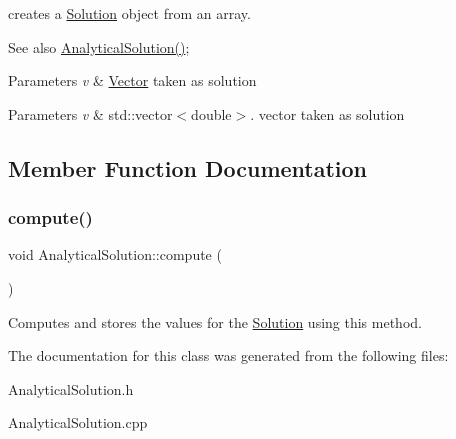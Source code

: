 creates a \hyperlink{class_solution}{Solution} object from an array. \begin{DoxySeeAlso}{See also}
\hyperlink{class_analytical_solution_a92a4ce87e863ec7f8aac59372306efd2}{Analytical\+Solution()}; 
\end{DoxySeeAlso}

\begin{DoxyParams}{Parameters}
{\em v} & \hyperlink{class_vector}{Vector} taken as solution \\
\hline
\end{DoxyParams}

\begin{DoxyParams}{Parameters}
{\em v} & std\+::vector$<$double$>$. vector taken as solution \\
\hline
\end{DoxyParams}


\subsection{Member Function Documentation}
\mbox{\label{class_analytical_solution_ae1ebc556a8dfed55b6c463625545d919}} 
\subsubsection{\texorpdfstring{compute()}{compute()}}
{\footnotesize\ttfamily void Analytical\+Solution\+::compute (\begin{DoxyParamCaption}{ }\end{DoxyParamCaption})}

Computes and stores the values for the \hyperlink{class_solution}{Solution} using this method. 

The documentation for this class was generated from the following files\+:\begin{DoxyCompactItemize}
\item 
Analytical\+Solution.\+h\item 
Analytical\+Solution.\+cpp\end{DoxyCompactItemize}

